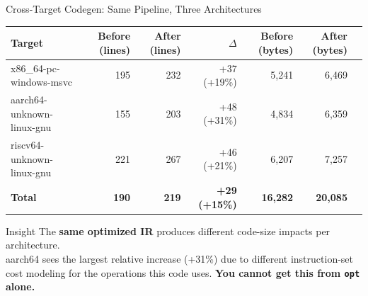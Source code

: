 \documentclass[aspectratio=169]{beamer}
\newcommand{\blue}[1]{\textcolor{LPTABlue}{#1}}
\begin{document}
\begin{frame}{Cross-Target Codegen: Same Pipeline, Three Architectures}
  \begin{tabular}{lrrrrrr}
    \toprule
    Target & Before (lines) & After (lines) & $\Delta$ & Before (bytes) & After (bytes) \\
    \midrule
    x86\_64-pc-windows-msvc & 195 & 232 & \blue{+37 (+19\%)} & 5,241 & 6,469 \\
    aarch64-unknown-linux-gnu & 155 & 203 & \blue{+48 (+31\%)} & 4,834 & 6,359 \\
    riscv64-unknown-linux-gnu & 221 & 267 & \blue{+46 (+21\%)} & 6,207 & 7,257 \\
    \midrule
    \textbf{Total} & \textbf{190} & \textbf{219} & \blue{\textbf{+29 (+15\%)}} & \textbf{16,282} & \textbf{20,085} \\
    \bottomrule
  \end{tabular}
  \vspace{0.5em}
  \begin{block}{Insight}
    The \textbf{same optimized IR} produces different code-size impacts per architecture.\\
    aarch64 sees the largest relative increase (+31\%) due to different instruction-set cost
    modeling for the operations this code uses. \textbf{You cannot get this from \texttt{opt} alone.}
  \end{block}
\end{frame}
\end{document}
